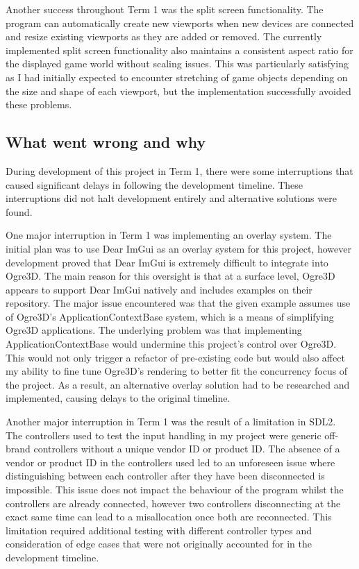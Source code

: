 \documentclass{article}
\begin{document}
Another success throughout Term 1 was the split screen functionality. The program can automatically create new viewports when new devices are connected and resize existing viewports as they are added or removed. The currently implemented split screen functionality also maintains a consistent aspect ratio for the displayed game world without scaling issues. This was particularly satisfying as I had initially expected to encounter stretching of game objects depending on the size and shape of each viewport, but the implementation successfully avoided these problems. \newline

\subsection{What went wrong and why}
During development of this project in Term 1, there were some interruptions that caused significant delays in following the development timeline. These interruptions did not halt development entirely and alternative solutions were found. \newline

One major interruption in Term 1 was implementing an overlay system. The initial plan was to use Dear ImGui as an overlay system for this project, however development proved that Dear ImGui is extremely difficult to integrate into Ogre3D. The main reason for this oversight is that at a surface level, Ogre3D appears to support Dear ImGui natively and includes examples on their repository. The major issue encountered was that the given example assumes use of Ogre3D's ApplicationContextBase system, which is a means of simplifying Ogre3D applications. The underlying problem was that implementing ApplicationContextBase would undermine this project's control over Ogre3D. This would not only trigger a refactor of pre-existing code but would also affect my ability to fine tune Ogre3D's rendering to better fit the concurrency focus of the project. As a result, an alternative overlay solution had to be researched and implemented, causing delays to the original timeline. \newline

Another major interruption in Term 1 was the result of a limitation in SDL2. The controllers used to test the input handling in my project were generic off-brand controllers without a unique vendor ID or product ID. The absence of a vendor or product ID in the controllers used led to an unforeseen issue where distinguishing between each controller after they have been disconnected is impossible. This issue does not impact the behaviour of the program whilst the controllers are already connected, however two controllers disconnecting at the exact same time can lead to a misallocation once both are reconnected. This limitation required additional testing with different controller types and consideration of edge cases that were not originally accounted for in the development timeline.
\end{document}
